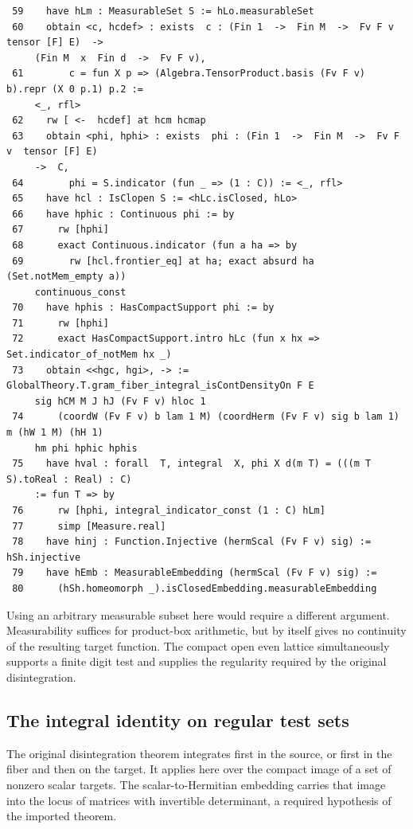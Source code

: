 \documentclass[12pt,letterpaper]{article}
\begin{document}
\par
{\fontsize{9.2}{11.2}\selectfont\begin{verbatim}
 59    have hLm : MeasurableSet S := hLo.measurableSet
 60    obtain <c, hcdef> : exists  c : (Fin 1  ->  Fin M  ->  Fv F v  tensor [F] E)  ->
     (Fin M  x  Fin d  ->  Fv F v),
 61        c = fun X p => (Algebra.TensorProduct.basis (Fv F v) b).repr (X 0 p.1) p.2 :=
     <_, rfl>
 62    rw [ <-  hcdef] at hcm hcmap
 63    obtain <phi, hphi> : exists  phi : (Fin 1  ->  Fin M  ->  Fv F v  tensor [F] E)
     ->  C,
 64        phi = S.indicator (fun _ => (1 : C)) := <_, rfl>
 65    have hcl : IsClopen S := <hLc.isClosed, hLo>
 66    have hphic : Continuous phi := by
 67      rw [hphi]
 68      exact Continuous.indicator (fun a ha => by
 69        rw [hcl.frontier_eq] at ha; exact absurd ha (Set.notMem_empty a))
     continuous_const
 70    have hphis : HasCompactSupport phi := by
 71      rw [hphi]
 72      exact HasCompactSupport.intro hLc (fun x hx => Set.indicator_of_notMem hx _)
 73    obtain <<hgc, hgi>, -> := GlobalTheory.T.gram_fiber_integral_isContDensityOn F E
     sig hCM M J hJ (Fv F v) hloc 1
 74      (coordW (Fv F v) b lam 1 M) (coordHerm (Fv F v) sig b lam 1) m (hW 1 M) (hH 1)
     hm phi hphic hphis
 75    have hval : forall  T, integral  X, phi X d(m T) = (((m T S).toReal : Real) : C)
     := fun T => by
 76      rw [hphi, integral_indicator_const (1 : C) hLm]
 77      simp [Measure.real]
 78    have hinj : Function.Injective (hermScal (Fv F v) sig) := hSh.injective
 79    have hEmb : MeasurableEmbedding (hermScal (Fv F v) sig) :=
 80      (hSh.homeomorph _).isClosedEmbedding.measurableEmbedding
\end{verbatim}}
Using an arbitrary measurable subset here would require a different argument. Measurability suffices for product-box arithmetic, but by itself gives no continuity of the resulting target function. The compact open even lattice simultaneously supports a finite digit test and supplies the regularity required by the original disintegration.
\clearpage{}\subsection*{The integral identity on regular test sets}\label{extract-FourContact96}
The original disintegration theorem integrates first in the source, or first in the fiber and then on the target. It applies here over the compact image of a set of nonzero scalar targets. The scalar-to-Hermitian embedding carries that image into the locus of matrices with invertible determinant, a required hypothesis of the imported theorem.
\end{document}
